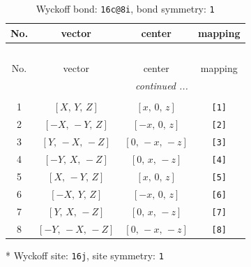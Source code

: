 \documentclass[fleqn,8pt]{jsarticle}
\begin{document}
\renewcommand{\arraystretch}{1.2}
\begin{longtable}{cccc}
\caption{Wyckoff bond: {\tt 16c@8i}, bond symmetry: {\tt 1}}
 \\
 \hline \hline
No. & vector & center & mapping \\ \hline \endfirsthead

\multicolumn{3}{l}{\tablename\ \thetable{}} \\
 \hline \hline
No. & vector & center & mapping \\ \hline \endhead

 \hline \hline
\multicolumn{3}{r}{\footnotesize\it continued ...} \\ \endfoot

 \hline \hline
\multicolumn{3}{r}{} \\ \endlastfoot

1 & $\left[ X,\, Y,\, Z \right]$ & $\left[ x,\, 0,\, z \right]$ & {\tt [1]} \\ \hline
2 & $\left[ - X,\, - Y,\, Z \right]$ & $\left[ - x,\, 0,\, z \right]$ & {\tt [2]} \\ \hline
3 & $\left[ Y,\, - X,\, - Z \right]$ & $\left[ 0,\, - x,\, - z \right]$ & {\tt [3]} \\ \hline
4 & $\left[ - Y,\, X,\, - Z \right]$ & $\left[ 0,\, x,\, - z \right]$ & {\tt [4]} \\ \hline
5 & $\left[ X,\, - Y,\, Z \right]$ & $\left[ x,\, 0,\, z \right]$ & {\tt [5]} \\ \hline
6 & $\left[ - X,\, Y,\, Z \right]$ & $\left[ - x,\, 0,\, z \right]$ & {\tt [6]} \\ \hline
7 & $\left[ Y,\, X,\, - Z \right]$ & $\left[ 0,\, x,\, - z \right]$ & {\tt [7]} \\ \hline
8 & $\left[ - Y,\, - X,\, - Z \right]$ & $\left[ 0,\, - x,\, - z \right]$ & {\tt [8]} \\
\end{longtable}
* Wyckoff site: {\tt 16j}, site symmetry: {\tt 1}
\renewcommand{\arraystretch}{1.2}
\end{document}
